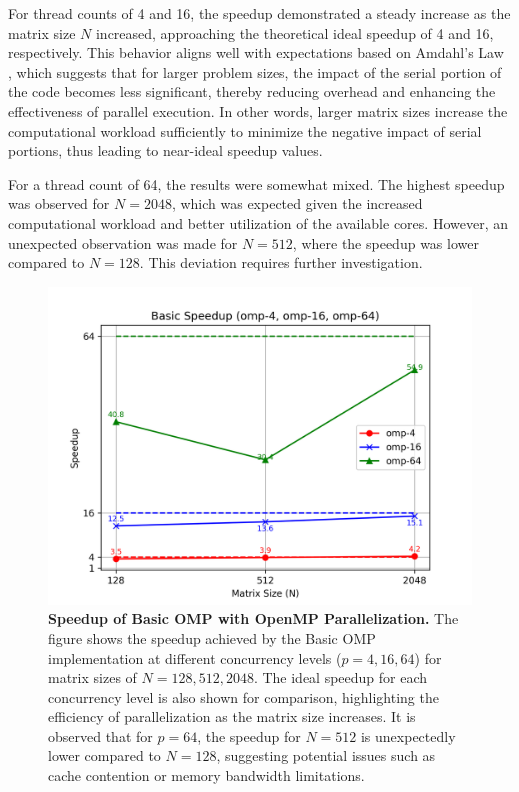 For thread counts of 4 and 16, the speedup demonstrated a steady increase as the matrix size \(N\) increased, approaching the theoretical ideal speedup of 4 and 16, respectively. This behavior aligns well with expectations based on Amdahl's Law \cite{amdahl1967validity}, which suggests that for larger problem sizes, the impact of the serial portion of the code becomes less significant, thereby reducing overhead and enhancing the effectiveness of parallel execution. In other words, larger matrix sizes increase the computational workload sufficiently to minimize the negative impact of serial portions, thus leading to near-ideal speedup values.

For a thread count of 64, the results were somewhat mixed. The highest speedup was observed for \(N = 2048\), which was expected given the increased computational workload and better utilization of the available cores. However, an unexpected observation was made for \(N = 512\), where the speedup was lower compared to \(N = 128\). This deviation requires further investigation.

\begin{figure}[htbp]
    \centering
    \includegraphics[width=1.0\linewidth]{images/Basic_Speedup.png}
    \caption{\textbf{Speedup of Basic OMP with OpenMP Parallelization.} The figure shows the speedup achieved by the Basic OMP implementation at different concurrency levels (\(p = 4, 16, 64\)) for matrix sizes of \(N = 128, 512, 2048\). The ideal speedup for each concurrency level is also shown for comparison, highlighting the efficiency of parallelization as the matrix size increases. It is observed that for \(p = 64\), the speedup for \(N = 512\) is unexpectedly lower compared to \(N = 128\), suggesting potential issues such as cache contention or memory bandwidth limitations.}
    \label{fig:basic-speedup}
\end{figure}


